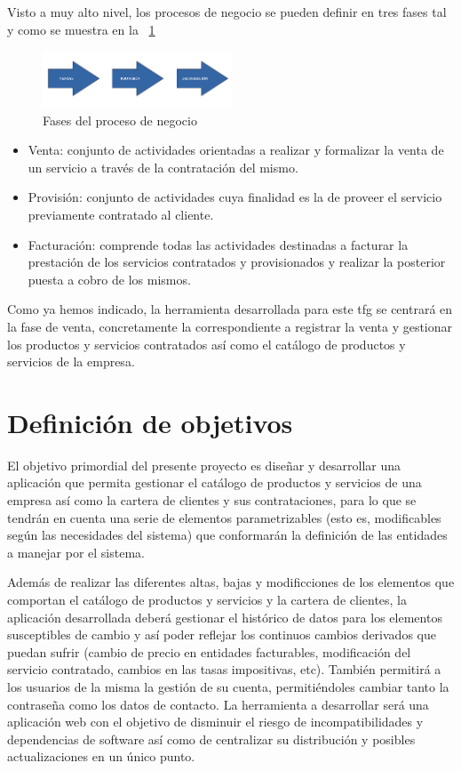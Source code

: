 Visto a muy alto nivel, los procesos de negocio se pueden definir en tres fases tal y como se muestra en la \figurename~\ref{fig:fases-proceso-negocio} 

\begin{figure}[hp!]
  \centering
  \includegraphics[width=0.50\textwidth]{imaxes/fases-proceso-negocio.png}
  \caption{Fases del proceso de negocio}
  \label{fig:fases-proceso-negocio}
\end{figure}

\begin{itemize}
\item Venta: conjunto de actividades orientadas a realizar y formalizar la venta de un servicio a través de la contratación del mismo.
\item Provisión: conjunto de actividades cuya finalidad es la de proveer el servicio previamente contratado al cliente.
\item Facturación: comprende todas las actividades destinadas a facturar la prestación de los servicios contratados y provisionados y realizar la posterior puesta a cobro de los mismos.
\end{itemize}

Como ya hemos indicado, la herramienta desarrollada para este \acrlong{tfg} se centrará en la fase de venta, concretamente la correspondiente a registrar la venta y gestionar los productos y servicios contratados así como el catálogo de productos y servicios de la empresa.


\section{Definición de objetivos}
\label{sec:objetivos}


El objetivo primordial del presente proyecto es diseñar y desarrollar una aplicación que permita gestionar el catálogo de productos y servicios de una empresa así como la cartera de clientes y sus contrataciones, para lo que se tendrán en cuenta una serie de elementos parametrizables (esto es, modificables según las necesidades del sistema) que conformarán la definición de las entidades a manejar por el sistema.

Además de realizar las diferentes altas, bajas y modificciones de los elementos que comportan el catálogo de productos y servicios y la cartera de clientes, la aplicación desarrollada deberá gestionar el histórico de datos para los elementos susceptibles de cambio y así poder reflejar los continuos cambios derivados que puedan sufrir (cambio de precio en entidades facturables, modificación del servicio contratado, cambios en las tasas impositivas, etc). También permitirá a los usuarios de la misma la gestión de su cuenta, permitiéndoles cambiar tanto la contraseña como los datos de contacto.
La herramienta a desarrollar será una aplicación web con el objetivo de disminuir el riesgo de incompatibilidades y dependencias de software así como de centralizar su distribución y posibles actualizaciones en un único punto.

